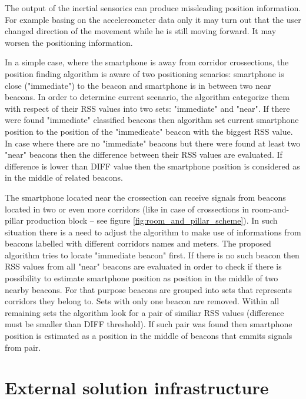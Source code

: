 \documentclass[../main.tex]{subfiles}
\begin{document}
The output of the inertial sensorics can produce missleading position information. For example basing on the accelereometer data only it may turn out that the user changed direction of the movement while he is still moving forward. It may worsen the positioning information.

In a simple case, where the smartphone is away from corridor crossections, the position finding algorithm is aware of two positioning senarios: smartphone is close ("immediate") to the beacon and smartphone is in between two near beacons. In order to determine current scenario, the algorithm categorize them with respect of their RSS values into two sets: "immediate" and "near". If there were found "immediate" classified beacons then algorithm set current smartphone position to the position of the "immedieate" beacon with the biggest RSS value. In case where there are no "immediate" beacons but there were found at least two "near" beacons then the difference between their RSS values are evaluated. If difference is lower than DIFF value then the smartphone position is considered as in the middle of related beacons.

The smartphone located near the crossection can receive signals from beacons located in two or even more corridors (like in case of crossections in room-and-pillar production block -- see figure \ref{fig:room_and_pillar_scheme}). In such situation there is a need to adjust the algorithm to make use of informations from beacons labelled with different corridors names and meters. The proposed algorithm tries to locate "immediate beacon" first. If there is no such beacon then RSS values from all "near" beacons are evaluated in order to check if there is possibility to estimate smartphone position as position in the middle of two nearby beacons. For that purpose beacons are grouped into sets that represents corridors they belong to. Sets with only one beacon are removed. Within all remaining sets the algorithm look for a pair of similiar RSS values (difference must be smaller than DIFF threshold). If such pair was found then smartphone position is estimated as a position in the middle of beacons that emmits signals from pair.


\section{External solution infrastructure} %
\label{sec:external_solution_infrastructure}
\end{document}
